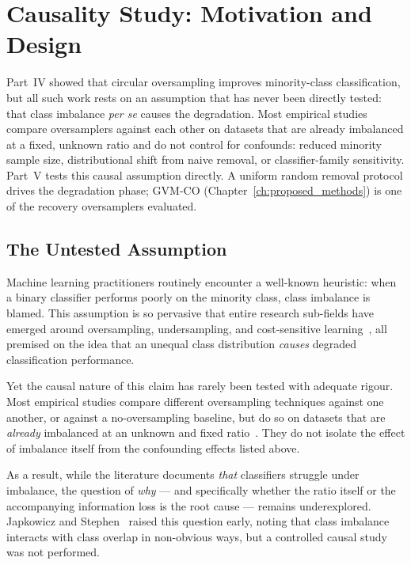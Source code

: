 
\chapter{Causality Study: Motivation and Design}
\label{ch:causality_intro}

Part~IV showed that circular oversampling improves minority-class classification, but all such work rests on an assumption that has never been directly tested: that class imbalance \emph{per se} causes the degradation.
Most empirical studies compare oversamplers against each other on datasets that are already imbalanced at a fixed, unknown ratio and do not control for confounds: reduced minority sample size, distributional shift from naive removal, or classifier-family sensitivity.
Part~V tests this causal assumption directly.
A uniform random removal protocol drives the degradation phase; GVM-CO (Chapter~\ref{ch:proposed_methods}) is one of the recovery oversamplers evaluated.


\section{The Untested Assumption}
\label{sec:causal:assumption}

Machine learning practitioners routinely encounter a well-known heuristic: when a binary classifier performs poorly on the minority class, class imbalance is blamed.
This assumption is so pervasive that entire research sub-fields have emerged around oversampling, undersampling, and cost-sensitive learning~\cite{he2009learning, fernandez2018learning}, all premised on the idea that an unequal class distribution \emph{causes} degraded classification performance.

Yet the causal nature of this claim has rarely been tested with adequate rigour.
Most empirical studies compare different oversampling techniques against one another, or against a no-oversampling baseline, but do so on datasets that are \emph{already} imbalanced at an unknown and fixed ratio~\cite{krawczyk2016learning, haixiang2017learning}.
They do not isolate the effect of imbalance itself from the confounding effects listed above.

As a result, while the literature documents \emph{that} classifiers struggle under imbalance, the question of \emph{why} --- and specifically whether the ratio itself or the accompanying information loss is the root cause --- remains underexplored.
Japkowicz and Stephen~\cite{japkowicz2002class} raised this question early, noting that class imbalance interacts with class overlap in non-obvious ways, but a controlled causal study was not performed.

